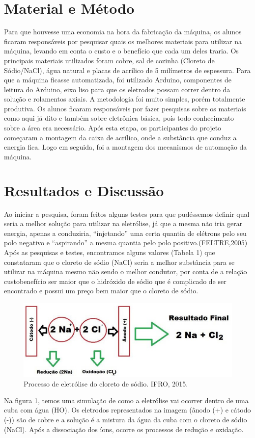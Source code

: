 \documentclass[article,12pt,onesidea,4paper,english,brazil]{abntex2}
\begin{document}
	\section*{Material e Método}
	
	Para que houvesse uma economia na hora da fabricação da máquina, os
	alunos ficaram responsáveis por pesquisar quais os melhores materiais para utilizar
	na máquina, levando em conta o custo e o benefício que cada um deles traria. Os
	principais materiais utilizados foram cobre, sal de cozinha (Cloreto de Sódio/NaCl),
	água natural e placas de acrílico de 5 milímetros de espessura. Para que a máquina
	ficasse automatizada, foi utilizado Arduino, componentes de leitura do Arduino, eixo
	liso para que os eletrodos possam correr dentro da solução e rolamentos axiais.
	A metodologia foi muito simples, porém totalmente produtiva. Os alunos
	ficaram responsáveis por fazer pesquisas sobre os materiais como aqui já dito e
	também sobre eletrônica básica, pois todo conhecimento sobre a área era
	necessário. Após esta etapa, os participantes do projeto começaram a montagem da
	caixa de acrílico, onde a substância que conduz a energia fica. Logo em seguida, foi
	a montagem dos mecanismos de automação da máquina.
	
	\section*{Resultados e Discussão}
	Ao iniciar a pesquisa, foram feitos alguns testes para que pudéssemos definir
	qual seria a melhor solução para utilizar na eletrólise, já que a mesma não iria gerar
	energia, apenas a conduziria, “injetando” uma certa quantia de elétrons pelo seu
	polo negativo e “aspirando” a mesma quantia pelo polo positivo.(FELTRE,2005)
	Após as pesquisas e testes, encontramos alguns valores (Tabela 1) que
	constataram que o cloreto de sódio (NaCl) seria a melhor substância para se utilizar
	na máquina mesmo não sendo o melhor condutor, por conta de a relação custobenefício ser maior que o hidróxido de sódio que é complicado de ser encontrado e
	possui um preço bem maior que o cloreto de sódio.
	
	\begin{figure}[h]
		\centering
		\includegraphics[width=0.7\linewidth]{pip-67-1}
		\caption{ Processo de eletrólise do cloreto de sódio. IFRO, 2015.}
		\label{fig:pip-67-1}
	\end{figure}
Na figura 1, temos uma simulação de como a eletrólise vai ocorrer dentro de
uma cuba com água (HO). Os eletrodos representados na imagem (ânodo (+) e
cátodo (-)) são de cobre e a solução é a mistura da água da cuba com o cloreto de
sódio (NaCl). Após a dissociação dos íons, ocorre os processos de redução e
oxidação.
\end{document}
